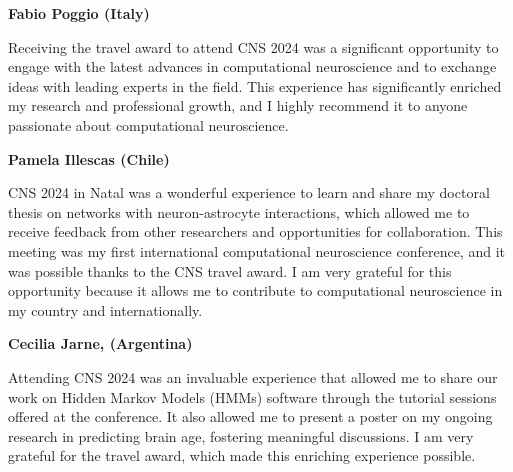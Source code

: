 \vspace{2ex}
\noindent{}\textbf{Fabio Poggio (Italy)}
\begin{displayquote}
Receiving the travel award to attend CNS 2024 was a significant opportunity to engage with the latest advances in computational neuroscience and to exchange ideas with leading experts in the field. This experience has significantly enriched my research and professional growth, and I highly recommend it to anyone passionate about computational neuroscience.
\end{displayquote}
\clearpage
\noindent{}\textbf{Pamela Illescas (Chile)}
\begin{displayquote}
CNS 2024 in Natal was a wonderful experience to learn and share my doctoral thesis on networks with neuron-astrocyte interactions, which allowed
me to receive feedback from other researchers and opportunities for collaboration. This meeting was my first international computational neuroscience conference, and it was possible thanks to the CNS travel award. I am very grateful for this opportunity because it allows me to contribute to computational neuroscience in my country and internationally.
\end{displayquote}

\vspace{2ex}
\noindent{}\textbf{Cecilia Jarne, (Argentina)}
\begin{displayquote}
Attending CNS 2024 was an invaluable experience that allowed me to share our work on Hidden Markov Models (HMMs) software through the tutorial sessions offered at the conference. It also allowed me to present a poster on my ongoing research in predicting brain age, fostering meaningful discussions. I am very grateful for the travel award, which made this enriching experience possible.
\end{displayquote}


